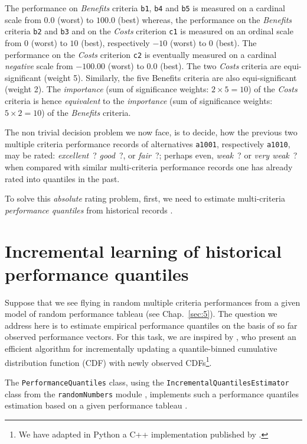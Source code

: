 The performance on \emph{Benefits} criteria \texttt{b1}, \texttt{b4} and \texttt{b5} is measured on a cardinal scale from $0.0$ (worst) to $100.0$ (best) whereas, the performance on the \emph{Benefits} criteria \texttt{b2} and \texttt{b3}  and on the \emph{Costs} criterion \texttt{c1} is measured on an ordinal scale from $0$ (worst) to $10$ (best), respectively $-10$ (worst) to $0$ (best). The performance on the \emph{Costs} criterion \texttt{c2} is eventually measured on a cardinal \emph{negative} scale from $-100.00$ (worst) to $0.0$ (best). The two \emph{Costs} criteria are equi-significant (weight 5). Similarly, the five Benefits criteria are also equi-significant (weight 2). The \emph{importance} (sum of significance weights: $2 \times 5 = 10$) of the \emph{Costs} criteria is hence \emph{equivalent} to the \emph{importance} (sum of significance weights: $5 \times 2 = 10$) of the \emph{Benefits} criteria.
   
The non trivial decision problem we now face, is to decide, how the previous two multiple criteria performance records of alternatives \texttt{a1001}, respectively \texttt{a1010},  may be rated: \emph{excellent}~? \emph{good}~?, or \emph{fair}~?; perhaps even, \emph{weak}~? or \emph{very weak}~? when compared with similar multi-criteria performance records one has already rated into quantiles in the past. 

To solve this \emph{absolute} rating problem, first, we need to estimate multi-criteria \emph{performance quantiles} from historical records \citep{CPSTAT-L5}.  

\section{Incremental learning of historical performance quantiles}
\label{sec:10.2}

Suppose that we see flying in random multiple criteria performances from a given model of random performance tableau (see Chap.~\ref{sec:5}). The question we address here is to estimate empirical performance quantiles on the basis of so far observed performance vectors. For this task, we are inspired by \citet*{CHAM-2006}, who present an efficient algorithm for incrementally updating a quantile-binned cumulative distribution function (CDF) with newly observed CDFs\footnote{We have adapted in Python a C++ implementation published by \citep*[Chapter 5]{NR3-2007}.}. 

The \texttt{PerformanceQuantiles} class, using the \texttt{IncrementalQuan\-tiles\-Estimator} class from the \texttt{randomNumbers} module , implements such a performance quantiles estimation based on a given performance tableau \citep{BIS-2021b}.

